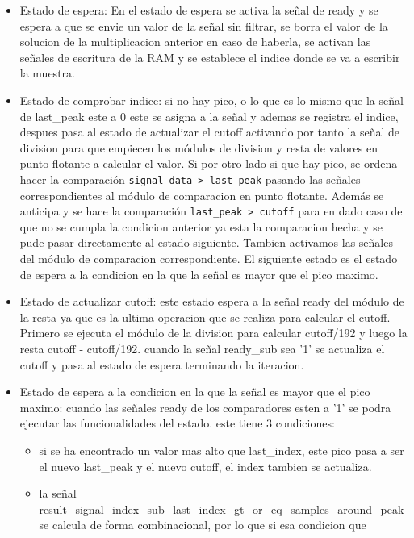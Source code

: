 \begin{itemize}
    \item Estado de espera: En el estado de espera se activa la señal de ready y se espera a que se envie un valor de la
    señal sin filtrar, se borra el valor de la solucion de la multiplicacion anterior en caso de haberla, se activan las
    señales de escritura de la RAM y se establece el indice donde se va a escribir la muestra.
    \item Estado de comprobar indice: si no hay pico, o lo que es lo mismo que la señal de last\_peak este a 0 este se asigna
     a la señal y ademas se registra el indice, despues pasa al estado de actualizar el cutoff activando por tanto la señal de 
     division para que empiecen los módulos de division y resta de valores en punto flotante a calcular el valor. Si por otro
     lado si que hay pico, se ordena hacer la comparación \lstinline{signal_data > last_peak} pasando las señales correspondientes al módulo de comparacion en 
     punto flotante. Además se anticipa y se hace la comparación \lstinline{last_peak > cutoff} para en dado caso de que no se cumpla la 
     condicion anterior ya esta la comparacion hecha y se pude pasar directamente al estado siguiente. Tambien activamos las señales
     del módulo de comparacion correspondiente. El siguiente estado es el estado de espera a la condicion en la que la señal es mayor 
     que el pico maximo.
    \item Estado de actualizar cutoff: este estado espera a la señal ready del módulo de la resta ya que es la ultima operacion que se realiza para 
    calcular el cutoff. Primero se ejecuta el módulo de la division para calcular cutoff/192 y luego la resta cutoff - cutoff/192. cuando la señal
    ready\_sub sea '1' se actualiza el cutoff y pasa al estado de espera terminando la iteracion. 
    \item Estado de espera a la condicion en la que la señal es mayor que el pico maximo: cuando las señales ready de los comparadores esten a '1' 
    se podra ejecutar las funcionalidades del estado. este tiene 3 condiciones:
    \begin{itemize}
        \item si se ha encontrado un valor mas alto que last\_index, este pico pasa a ser el nuevo last\_peak y el nuevo cutoff, el index tambien se actualiza. 
        \item la señal result\_signal\_index\_sub\_last\_index\_gt\_or\_eq\_samples\_around\_peak se calcula de forma combinacional, por lo que si esa condicion que

\end{itemize}
\end{itemize}
